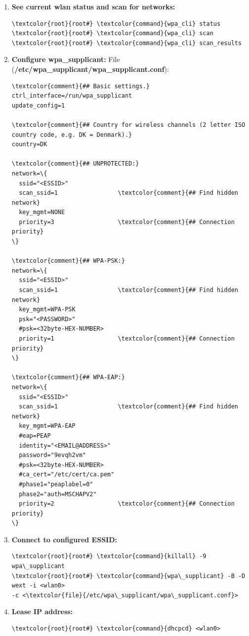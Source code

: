 \documentclass[10pt, a4paper, onecolumn, oneside, titlepage, openany]{book}
\begin{document}
\begin{itemize}
\begin{enumerate}
        \item \textbf{See current wlan status and scan for networks:}
\begin{Verbatim}[commandchars=\\\{\}]
\textcolor{root}{root#} \textcolor{command}{wpa_cli} status
\textcolor{root}{root#} \textcolor{command}{wpa_cli} scan
\textcolor{root}{root#} \textcolor{command}{wpa_cli} scan_results
\end{Verbatim}
        \item \textbf{Configure wpa\_supplicant:}
\newline File (\textbf{\textcolor{file}{/etc/wpa\_supplicant/wpa\_supplicant.conf}}):
\begin{Verbatim}[commandchars=\\\{\}]
\textcolor{comment}{## Basic settings.}
ctrl_interface=/run/wpa_supplicant
update_config=1

\textcolor{comment}{## Country for wireless channels (2 letter ISO country code, e.g. DK = Denmark).}
country=DK

\textcolor{comment}{## UNPROTECTED:}
network=\{
  ssid="<ESSID>"
  scan_ssid=1                 \textcolor{comment}{## Find hidden network}
  key_mgmt=NONE
  priority=3                  \textcolor{comment}{## Connection priority}
\}

\textcolor{comment}{## WPA-PSK:}
network=\{
  ssid="<ESSID>"
  scan_ssid=1                 \textcolor{comment}{## Find hidden network}
  key_mgmt=WPA-PSK
  psk="<PASSWORD>"
  #psk=<32byte-HEX-NUMBER>
  priority=1                  \textcolor{comment}{## Connection priority}
\}

\textcolor{comment}{## WPA-EAP:}
network=\{
  ssid="<ESSID>"
  scan_ssid=1                 \textcolor{comment}{## Find hidden network}
  key_mgmt=WPA-EAP
  #eap=PEAP
  identity="<EMAIL@ADDRESS>"
  password="9evqh2vm"
  #psk=<32byte-HEX-NUMBER>
  #ca_cert="/etc/cert/ca.pem"
  #phase1="peaplabel=0"
  phase2="auth=MSCHAPV2"
  priority=2                  \textcolor{comment}{## Connection priority}
\}
\end{Verbatim}
    \item \textbf{Connect to configured ESSID:}
\begin{Verbatim}[commandchars=\\\{\}]
\textcolor{root}{root#} \textcolor{command}{killall} -9 wpa\_supplicant
\textcolor{root}{root#} \textcolor{command}{wpa\_supplicant} -B -D wext -i <wlan0>
-c <\textcolor{file}{/etc/wpa\_supplicant/wpa\_supplicant.conf}>
\end{Verbatim}
    \item \textbf{Lease IP address:}
\begin{Verbatim}[commandchars=\\\{\}]
\textcolor{root}{root#} \textcolor{command}{dhcpcd} <wlan0>
\end{Verbatim}
    \end{enumerate}
\end{itemize}
\end{document}
